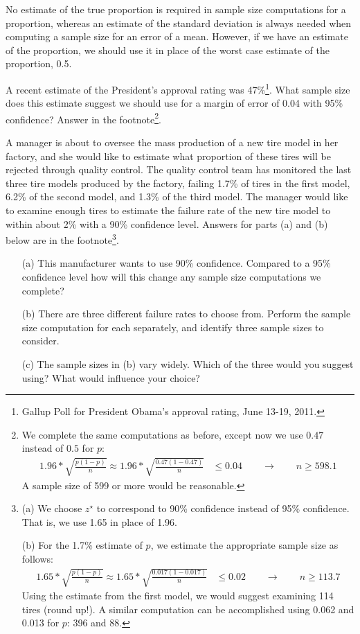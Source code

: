 No estimate of the true proportion is required in sample size computations for a proportion, whereas an estimate of the standard deviation is always needed when computing a sample size for an error of a mean. However, if we have an estimate of the proportion, we should use it in place of the worst case estimate of the proportion, 0.5.

\begin{exercise}
A recent estimate of the President's approval rating was 47\%\footnote{Gallup Poll for President Obama's approval rating, June 13-19, 2011.}. What sample size does this estimate suggest we should use for a margin of error of 0.04 with 95\% confidence? Answer in the footnote\footnote{We complete the same computations as before, except now we use $0.47$ instead of $0.5$ for $p$:
\begin{align*}
1.96*\sqrt{\frac{p(1-p)}{n}} \approx
1.96*\sqrt{\frac{0.47(1-0.47)}{n}} &\leq 0.04 \qquad\to\qquad n \geq 598.1
\end{align*}
A sample size of 599 or more would be reasonable.}.
\end{exercise}

\begin{exercise}
A manager is about to oversee the mass production of a new tire model in her factory, and she would like to estimate what proportion of these tires will be rejected through quality control. The quality control team has monitored the last three tire models produced by the factory, failing 1.7\% of tires in the first model, 6.2\% of the second model, and 1.3\% of the third model. The manager would like to examine enough tires to estimate the failure rate of the new tire model to within about 2\% with a 90\% confidence level. Answers for parts (a) and (b) below are in the footnote\footnote{(a) We choose $z^{\star}$ to correspond to 90\% confidence instead of 95\% confidence. That is, we use 1.65 in place of 1.96. \par
(b) For the 1.7\% estimate of $p$, we estimate the appropriate sample size as follows:
\begin{align*}
1.65*\sqrt{\frac{p(1-p)}{n}} \approx
1.65*\sqrt{\frac{0.017(1-0.017)}{n}} &\leq 0.02 \qquad\to\qquad n \geq 113.7
\end{align*}
Using the estimate from the first model, we would suggest examining 114 tires (round up!). A similar computation can be accomplished using 0.062 and 0.013 for $p$: 396 and 88.}.
\begin{itemize}
\setlength{\itemsep}{0mm}
\item[(a)] This manufacturer wants to use 90\% confidence. Compared to a 95\% confidence level how will this change any sample size computations we complete?
\item[(b)] There are three different failure rates to choose from. Perform the sample size computation for each separately, and identify three sample sizes to consider.
\item[(c)] The sample sizes in (b) vary widely. Which of the three would you suggest using? What would influence your choice?
\end{itemize}
\end{exercise}

